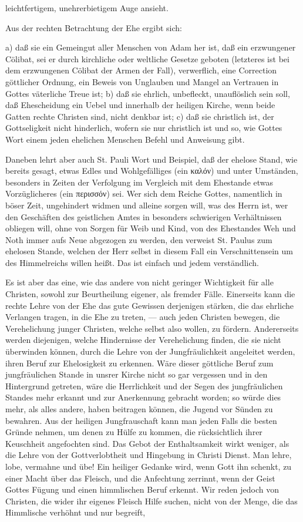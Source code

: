 leichtfertigem, unehrerbietigem Auge ansieht.\par Aus der rechten Betrachtung der Ehe ergibt sich:\par a) daß sie ein Gemeingut aller Menschen von Adam her ist, daß ein erzwungener Cölibat, sei er durch kirchliche oder weltliche Gesetze geboten (letzteres ist bei dem erzwungenen Cölibat der Armen der Fall), verwerflich, eine Correction göttlicher Ordnung, ein Beweis von Unglauben und Mangel an Vertrauen in Gottes väterliche Treue ist; b) daß sie ehrlich, unbefleckt, unauflöslich sein soll, daß Ehescheidung ein Uebel und innerhalb der heiligen Kirche, wenn beide Gatten rechte Christen sind, nicht denkbar ist; c) daß sie christlich ist, der Gottseligkeit nicht hinderlich, wofern sie nur christlich ist und so, wie Gottes Wort einem jeden ehelichen Menschen Befehl und Anweisung gibt.\par Daneben lehrt aber auch St. Pauli Wort und Beispiel, daß der ehelose Stand, wie bereits gesagt, etwas Edles und Wohlgefälliges (ein καλόν) und unter Umständen, besonders in Zeiten der Verfolgung im Vergleich mit dem Ehestande etwas Vorzüglicheres (ein περισσόν) sei. Wer sich dem Reiche Gottes, namentlich in böser Zeit, ungehindert widmen und alleine sorgen will, was des Herrn ist, wer den Geschäften des geistlichen Amtes in besonders schwierigen Verhältnissen obliegen will, ohne von Sorgen für Weib und Kind, von des Ehestandes Weh und Noth immer aufs Neue abgezogen zu werden, den verweist St. Paulus zum ehelosen Stande, welchen der Herr selbst in diesem Fall ein Verschnittensein um des Himmelreichs willen heißt. Das ist einfach und jedem verständlich.\par Es ist aber das eine, wie das andere von nicht geringer Wichtigkeit für alle Christen, sowohl zur Beurtheilung eigener, als fremder Fälle. Einerseits kann die rechte Lehre von der Ehe das gute Gewissen derjenigen stärken, die das ehrliche Verlangen tragen, in die Ehe zu treten, — auch jeden Christen bewegen, die Verehelichung junger Christen, welche selbst also wollen, zu fördern. Andererseits werden diejenigen, welche Hindernisse der Verehelichung finden, die sie nicht überwinden können, durch die Lehre von der Jungfräulichkeit angeleitet werden, ihren Beruf zur Ehelosigkeit zu erkennen. Wäre dieser göttliche Beruf zum jungfräulichen Stande in unsrer Kirche nicht so gar vergessen und in den Hintergrund getreten, wäre die Herrlichkeit und der Segen des jungfräulichen Standes mehr erkannt und zur Anerkennung gebracht worden; so würde dies mehr, als alles andere, haben beitragen können, die Jugend vor Sünden zu bewahren. Aus der heiligen Jungfrauschaft kann man jeden Falls die besten Gründe nehmen, um denen zu Hülfe zu kommen, die rücksichtlich ihrer Keuschheit angefochten sind. Das Gebot der Enthaltsamkeit wirkt weniger, als die Lehre von der Gottverlobtheit und Hingebung in Christi Dienst. Man lehre, lobe, vermahne und übe! Ein heiliger Gedanke wird, wenn Gott ihn schenkt, zu einer Macht über das Fleisch, und die Anfechtung zerrinnt, wenn der Geist Gottes Fügung und einen himmlischen Beruf erkennt. Wir reden jedoch von Christen, die wider ihr eigenes Fleisch Hilfe suchen, nicht von der Menge, die das Himmlische verhöhnt und nur begreift, 